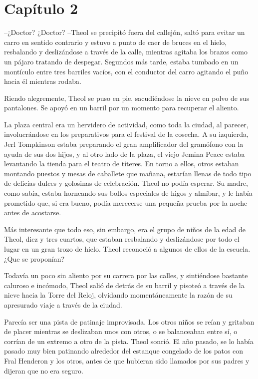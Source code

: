 \chapter*{Capítulo 2}

--¿Doctor? ¿Doctor? --Theol se precipitó fuera del callejón, saltó para evitar un carro en sentido contrario y estuvo a punto de caer de bruces en el hielo, resbalando y deslizándose a través de la calle, mientras agitaba los brazos como un pájaro tratando de despegar. Segundos más tarde, estaba tumbado en un montículo entre tres barriles vacíos, con el conductor del carro agitando el puño hacia él mientras rodaba. 



Riendo alegremente, Theol se puso en pie, sacudiéndose la nieve en polvo de sus pantalones. Se apoyó en un barril por un momento para recuperar el aliento. 



La plaza central era un hervidero de actividad, como toda la ciudad, al parecer, involucrándose en los preparativos para el festival de la cosecha. A su izquierda, Jerl Tompkinson estaba preparando el gran amplificador del gramófono con la ayuda de sus dos hijos, y al otro lado de la plaza, el viejo Jemina Peace estaba levantando la tienda para el teatro de títeres. En torno a ellos, otros estaban montando puestos y mesas de caballete que mañana, estarían llenas de todo tipo de delicias dulces y golosinas de celebración. Theol no podía esperar. Su madre, como sabía, estaba horneando sus bollos especiales de higos y almíbar, y le había prometido que, si era bueno, podía merecerse una pequeña prueba por la noche antes de acostarse. 



Más interesante que todo eso, sin embargo, era el grupo de niños de la edad de Theol, diez y tres cuartos, que estaban resbalando y deslizándose por todo el lugar en un gran trozo de hielo. Theol reconoció a algunos de ellos de la escuela. ¿Que se proponían?



Todavía un poco sin aliento por su carrera por las calles, y sintiéndose bastante caluroso e incómodo, Theol salió de detrás de su barril y pisoteó a través de la nieve hacia la Torre del Reloj, olvidando momentáneamente la razón de su apresurado viaje a través de la ciudad. 



Parecía ser una pista de patinaje improvisada. Los otros niños se reían y gritaban de placer mientras se deslizaban unos con otros, o se balanceaban entre sí, o corrían de un extremo a otro de la pista. Theol sonrió. El año pasado, se lo había pasado muy bien patinando alrededor del estanque congelado de los patos con Fral Henderon y los otros, antes de que hubieran sido llamados por sus padres y dijeran que no era seguro.

